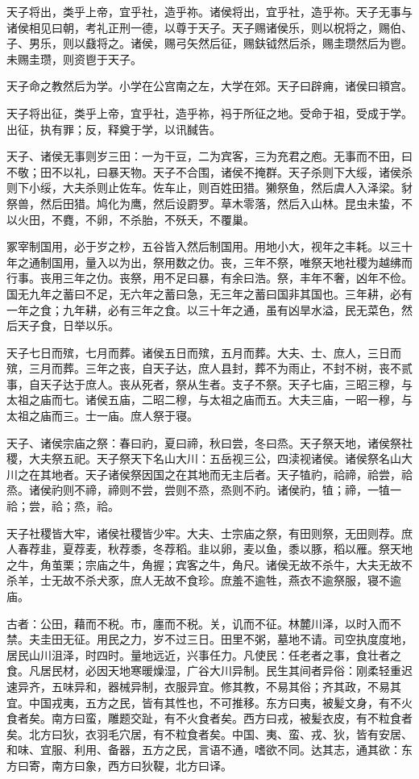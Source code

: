 \documentclass[]{article}
\begin{document}
天子将出，类乎上帝，宜乎社，造乎祢。诸侯将出，宜乎社，造乎祢。天子无事与诸侯相见曰朝，考礼正刑一德，以尊于天子。天子赐诸侯乐，则以柷将之，赐伯、子、男乐，则以鼗将之。诸侯，赐弓矢然后征，赐鈇钺然后杀，赐圭瓒然后为鬯。未赐圭瓒，则资鬯于天子。

天子命之教然后为学。小学在公宫南之左，大学在郊。天子曰辟痈，诸侯曰頖宫。

天子将出征，类乎上帝，宜乎社，造乎祢，祃于所征之地。受命于祖，受成于学。出征，执有罪；反，释奠于学，以讯馘告。

天子、诸侯无事则岁三田：一为干豆，二为宾客，三为充君之庖。无事而不田，曰不敬；田不以礼，曰暴天物。天子不合围，诸侯不掩群。天子杀则下大绥，诸侯杀则下小绥，大夫杀则止佐车。佐车止，则百姓田猎。獭祭鱼，然后虞人入泽梁。豺祭兽，然后田猎。鸠化为鹰，然后设罻罗。草木零落，然后入山林。昆虫未蛰，不以火田，不麑，不卵，不杀胎，不殀夭，不覆巢。

冢宰制国用，必于岁之杪，五谷皆入然后制国用。用地小大，视年之丰耗。以三十年之通制国用，量入以为出，祭用数之仂。丧，三年不祭，唯祭天地社稷为越绋而行事。丧用三年之仂。丧祭，用不足曰暴，有余曰浩。祭，丰年不奢，凶年不俭。国无九年之蓄曰不足，无六年之蓄曰急，无三年之蓄曰国非其国也。三年耕，必有一年之食；九年耕，必有三年之食。以三十年之通，虽有凶旱水溢，民无菜色，然后天子食，日举以乐。

天子七日而殡，七月而葬。诸侯五日而殡，五月而葬。大夫、士、庶人，三日而殡，三月而葬。三年之丧，自天子达，庶人县封，葬不为雨止，不封不树，丧不贰事，自天子达于庶人。丧从死者，祭从生者。支子不祭。天子七庙，三昭三穆，与太祖之庙而七。诸侯五庙，二昭二穆，与太祖之庙而五。大夫三庙，一昭一穆，与太祖之庙而三。士一庙。庶人祭于寝。

天子、诸侯宗庙之祭：春曰礿，夏曰禘，秋曰尝，冬曰烝。天子祭天地，诸侯祭社稷，大夫祭五祀。天子祭天下名山大川：五岳视三公，四渎视诸侯。诸侯祭名山大川之在其地者。天子诸侯祭因国之在其地而无主后者。天子犆礿，祫禘，祫尝，祫烝。诸侯礿则不禘，禘则不尝，尝则不烝，烝则不礿。诸侯礿，犆；禘，一犆一祫；尝，祫；烝，祫。

天子社稷皆大牢，诸侯社稷皆少牢。大夫、士宗庙之祭，有田则祭，无田则荐。庶人春荐韭，夏荐麦，秋荐黍，冬荐稻。韭以卵，麦以鱼，黍以豚，稻以雁。祭天地之牛，角茧栗；宗庙之牛，角握；宾客之牛，角尺。诸侯无故不杀牛，大夫无故不杀羊，士无故不杀犬豕，庶人无故不食珍。庶羞不逾牲，燕衣不逾祭服，寝不逾庙。

古者：公田，藉而不税。市，廛而不税。关，讥而不征。林麓川泽，以时入而不禁。夫圭田无征。用民之力，岁不过三日。田里不粥，墓地不请。司空执度度地，居民山川沮泽，时四时。量地远近，兴事任力。凡使民：任老者之事，食壮者之食。凡居民材，必因天地寒暖燥湿，广谷大川异制。民生其间者异俗：刚柔轻重迟速异齐，五味异和，器械异制，衣服异宜。修其教，不易其俗；齐其政，不易其宜。中国戎夷，五方之民，皆有其性也，不可推移。东方曰夷，被髪文身，有不火食者矣。南方曰蛮，雕题交趾，有不火食者矣。西方曰戎，被髪衣皮，有不粒食者矣。北方曰狄，衣羽毛穴居，有不粒食者矣。中国、夷、蛮、戎、狄，皆有安居、和味、宜服、利用、备器，五方之民，言语不通，嗜欲不同。达其志，通其欲：东方曰寄，南方曰象，西方曰狄鞮，北方曰译。
\end{document}

